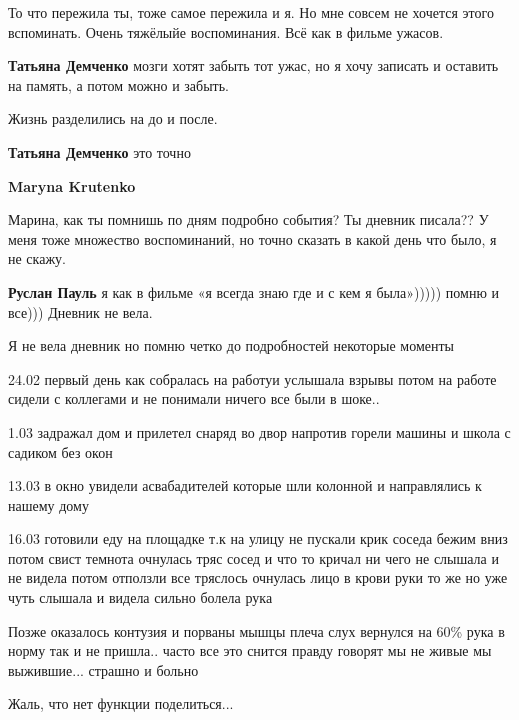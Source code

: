 
То что пережила ты, тоже самое пережила и я. Но мне совсем не хочется этого
вспоминать. Очень тяжёлыйе воспоминания. Всё как в фильме ужасов.

\begin{itemize} %
\textbf{Татьяна Демченко} мозги хотят забыть тот ужас, но я хочу записать и оставить на память, а потом можно и забыть.


Жизнь разделились на до и после.

\textbf{Татьяна Демченко} это точно
\end{itemize} %

\textbf{Maryna Krutenko} 

Марина, как ты помнишь по дням подробно события? Ты дневник писала?? У меня
тоже множество воспоминаний, но точно сказать в какой день что было, я не
скажу.

\begin{itemize} %
\textbf{Руслан Пауль} я как в фильме «я всегда знаю где и с кем я была»))))) помню и все))) Дневник не вела.
\end{itemize} %


Я не вела дневник но помню четко до подробностей некоторые моменты

24.02 первый день как собралась на работуи услышала взрывы потом на работе
сидели с коллегами и не понимали ничего все были в шоке..

1.03 задражал дом и прилетел снаряд во двор напротив горели машины и школа с
садиком без окон

13.03 в окно увидели асвабадителей которые шли колонной и направлялись к нашему
дому

16.03 готовили еду на площадке т.к на улицу не пускали крик соседа бежим вниз
потом свист темнота очнулась тряс сосед и что то кричал ни чего не слышала и не
видела потом отползли все тряслось очнулась лицо в крови руки то же но уже чуть
слышала и видела сильно болела рука

Позже оказалось контузия и порваны мышцы плеча слух вернулся на 60\% рука в
норму так и не пришла.. часто все это снится правду говорят мы не живые мы
выжившие... страшно и больно


Жаль, что нет функции поделиться...

